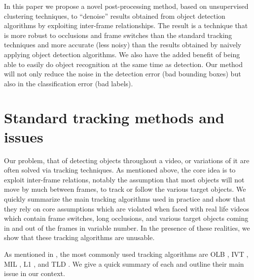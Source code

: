 \documentclass{article}
\begin{document}
In this paper we propose a novel post-processing method, based on unsupervised clustering techniques, to ``denoise'' results obtained 
from object detection algorithms by exploiting inter-frame relationships. The result is a technique that is more robust to occlusions and frame switches than the standard 
tracking techniques and more accurate (less noisy) than the results obtained by naively applying object detection algorithms. We also have the added benefit of being able to easily
do object recognition at the same time as detection. Our method will not only reduce the noise in the detection error (bad bounding boxes) but also in the classification error (bad labels).

\section{Standard tracking methods and issues}

Our problem, that of detecting objects throughout a video, or variations of it are often solved via tracking techniques. As mentioned above, the core idea is to exploit
inter-frame relations, notably the assumption that most objects will not move by much between frames, to track or follow the various target objects. We quickly summarize
the main tracking algorithms used in practice and show that they rely on core assumptions which are violated 
when faced with real life videos which contain frame switches, long occlusions, and various target objects coming in and out 
of the frames in variable number. In the presence of these realities, we show that these tracking algorithms are unusable.

As mentioned in \cite{benchmarksurvey}, the most commonly used tracking algorithms are OLB \cite{OLB}, IVT \cite{IVT}, MIL \cite{miltrack}, L1 \cite{L1}, and TLD \cite{TLD}.
We give a quick summary of each and outline their main issue in our context.
\end{document}
